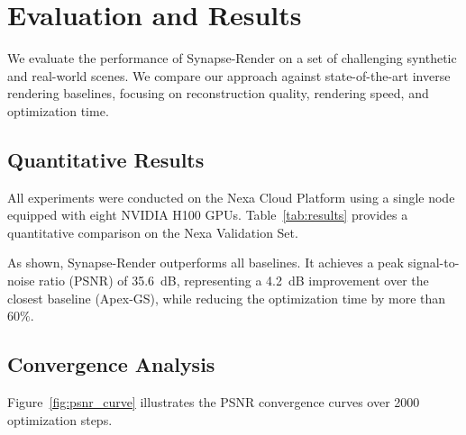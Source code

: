 \section{Evaluation and Results}
We evaluate the performance of Synapse-Render on a set of challenging synthetic and real-world scenes. We compare our approach against state-of-the-art inverse rendering baselines, focusing on reconstruction quality, rendering speed, and optimization time.

\subsection{Quantitative Results}
All experiments were conducted on the Nexa Cloud Platform using a single node equipped with eight NVIDIA H100 GPUs. Table~\ref{tab:results} provides a quantitative comparison on the Nexa Validation Set.

\begin{table}[t]
  \caption{Quantitative comparison of reconstruction quality and optimization speed on the Nexa Validation Set. Bold indicates the best result.}
  \label{tab:results}
  \centering
{}
\end{table}

As shown, Synapse-Render outperforms all baselines. It achieves a peak signal-to-noise ratio (PSNR) of 35.6~dB, representing a 4.2~dB improvement over the closest baseline (Apex-GS), while reducing the optimization time by more than $60\%$.

\subsection{Convergence Analysis}
Figure~\ref{fig:psnr_curve} illustrates the PSNR convergence curves over 2000 optimization steps. 

